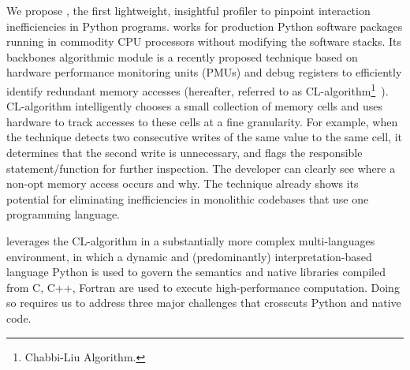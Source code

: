 

We propose \tool, the first lightweight, insightful profiler to pinpoint interaction inefficiencies in Python programs. \tool works for production Python software packages running in commodity CPU processors without modifying the software stacks. 
Its backbones algorithmic module is a recently proposed technique based on hardware performance monitoring units (PMUs) and debug registers to efficiently identify redundant memory accesses (hereafter, referred to as CL-algorithm\footnote{Chabbi-Liu Algorithm.}~\cite{wen2018watching, su2019pinpointing}). CL-algorithm intelligently chooses a small collection of memory cells and uses hardware to track accesses to these cells at a fine granularity. For example, when the technique detects two consecutive writes of the same value to the same cell, it determines that the second write is unnecessary, and flags the responsible statement/function for further inspection. The developer can clearly see where a non-opt memory access occurs and why.  The technique already shows its potential for eliminating inefficiencies in monolithic codebases that use one programming language.


\tool leverages the CL-algorithm in a substantially more complex multi-languages environment, in which a dynamic and (predominantly) interpretation-based language Python is used to govern the semantics and native libraries compiled from C, C++, Fortran are used to execute high-performance computation. Doing so requires us to address three major challenges that crosscuts Python and native code. 

